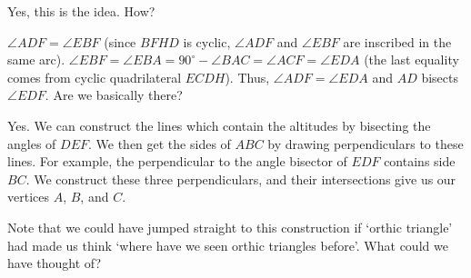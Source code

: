 
Yes, this is the idea. How?


$\angle ADF = \angle EBF$ (since $BFHD$ is cyclic, $\angle ADF$ and $\angle EBF$ are inscribed in the same arc). $\angle EBF = \angle EBA = 90^\circ - \angle BAC = \angle ACF = \angle EDA$ (the last equality comes from cyclic quadrilateral $ECDH$). Thus, $\angle ADF = \angle EDA$ and $AD$ bisects $\angle EDF$. Are we basically there?



Yes. We can construct the lines which contain the altitudes by bisecting the angles of $DEF$. We then get the sides of $ABC$ by drawing perpendiculars to these lines. For example, the perpendicular to the angle bisector of $EDF$ contains side $BC$. We construct these three perpendiculars, and their intersections give us our vertices $A$, $B$, and $C$.

\begin{remark}
    Note that we could have jumped straight to this construction if `orthic triangle' had made us think `where have we seen orthic triangles before'. What could we have thought of?    
\end{remark}







